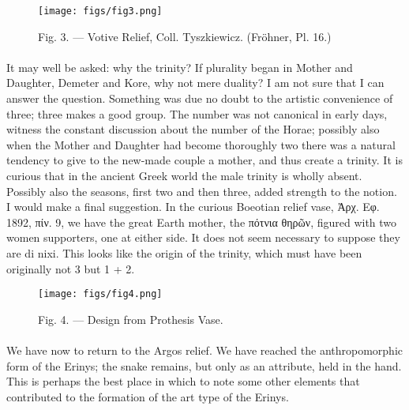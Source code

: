 \documentclass[a4paper, 11pt, oneside, polutonikogreek, english]{article}
\begin{document}
\begin{figure}[H]
\centering
\texttt{[image: figs/fig3.png]}
\caption{Fig. 3. --- Votive Relief, Coll. Tyszkiewicz. (Fröhner, Pl. 16.)}
\end{figure}
\paragraph{}
It may well be asked: why the trinity? If plurality began in Mother and Daughter, Demeter and Kore, why not mere duality? I am not sure that I can answer the question. Something was due no doubt to the artistic convenience of three; three makes a good group. The number was not canonical in early days, witness the constant discussion about the number of the Horae; possibly also when the Mother and Daughter had become thoroughly two there was a natural tendency to give to the new-made couple a mother, and thus create a trinity. It is curious that in the ancient Greek world the male trinity is wholly absent. Possibly also the seasons, first two and then three, added strength to the notion. I would make a final suggestion. In the curious Boeotian relief vase, Ἀρχ. Εφ. 1892, πίν. 9, we have the great Earth mother, the πότνια θηρῶν, figured with two women supporters, one at either side. It does not seem necessary to suppose they are di nixi. This looks like the origin of the trinity, which must have been originally not 3 but 1 + 2.
\begin{figure}[H]
\centering
\texttt{[image: figs/fig4.png]}
\caption{Fig. 4. --- Design from Prothesis Vase.}
\end{figure}
\paragraph{}
We have now to return to the Argos relief. We have reached the anthropomorphic form of the Erinys; the snake remains, but only as an attribute, held in the hand. This is perhaps the best place in which to note some other elements that contributed to the formation of the art type of the Erinys.
\end{document}
